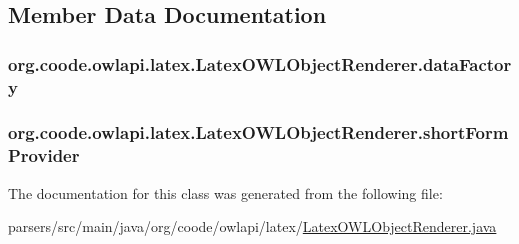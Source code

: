 \subsection{Member Data Documentation}
\hypertarget{classorg_1_1coode_1_1owlapi_1_1latex_1_1_latex_o_w_l_object_renderer_a4286edd6257b843af35ec94f2f9f102a}{
\subsubsection[{data\-Factory}]{ org.\-coode.\-owlapi.\-latex.\-Latex\-O\-W\-L\-Object\-Renderer.\-data\-Factory\hspace{0.3cm}{\ttfamily [private]}}}\label{classorg_1_1coode_1_1owlapi_1_1latex_1_1_latex_o_w_l_object_renderer_a4286edd6257b843af35ec94f2f9f102a}
\hypertarget{classorg_1_1coode_1_1owlapi_1_1latex_1_1_latex_o_w_l_object_renderer_ac8f37219b1dc96bc0a4cda384f7aa86e}{
\subsubsection[{short\-Form\-Provider}]{ org.\-coode.\-owlapi.\-latex.\-Latex\-O\-W\-L\-Object\-Renderer.\-short\-Form\-Provider\hspace{0.3cm}{\ttfamily [private]}}}\label{classorg_1_1coode_1_1owlapi_1_1latex_1_1_latex_o_w_l_object_renderer_ac8f37219b1dc96bc0a4cda384f7aa86e}


The documentation for this class was generated from the following file\-:\begin{DoxyCompactItemize}
\item 
parsers/src/main/java/org/coode/owlapi/latex/\hyperlink{_latex_o_w_l_object_renderer_8java}{Latex\-O\-W\-L\-Object\-Renderer.\-java}\end{DoxyCompactItemize}
